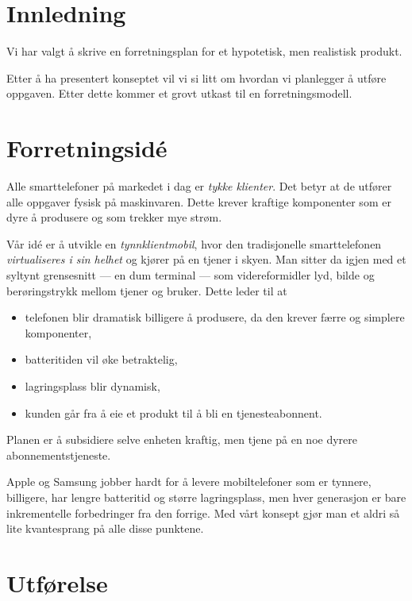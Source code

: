 \section{Innledning}

Vi har valgt å skrive en forretningsplan for et hypotetisk, men realistisk
produkt.

Etter å ha presentert konseptet vil vi si litt om hvordan vi planlegger å
utføre oppgaven. Etter dette kommer et grovt utkast til en forretningsmodell.

\section{Forretningsidé}

Alle smarttelefoner på markedet i dag er \textit{tykke klienter}. Det betyr at
de utfører alle oppgaver fysisk på maskinvaren. Dette krever kraftige
komponenter som er dyre å produsere og som trekker mye strøm.

Vår idé er å utvikle en \textit{tynnklientmobil}, hvor den tradisjonelle
smarttelefonen \textit{virtualiseres i sin helhet} og kjører på en tjener i
skyen. Man sitter da igjen med et syltynt grensesnitt --- en dum terminal ---
som videreformidler lyd, bilde og berøringstrykk mellom tjener og bruker. Dette
leder til at

\begin{itemize}
  \item telefonen blir dramatisk billigere å produsere, da den krever færre og
    simplere komponenter,
  \item batteritiden vil øke betraktelig,
  \item lagringsplass blir dynamisk,
  \item kunden går fra å eie et produkt til å bli en tjenesteabonnent.
\end{itemize}

Planen er å subsidiere selve enheten kraftig, men tjene på en noe dyrere
abonnementstjeneste.

Apple og Samsung jobber hardt for å levere mobiltelefoner som er tynnere,
billigere, har lengre batteritid og større lagringsplass, men hver generasjon
er bare inkrementelle forbedringer fra den forrige.  Med vårt konsept gjør man
et aldri så lite kvantesprang på alle disse punktene.

\section{Utførelse}

